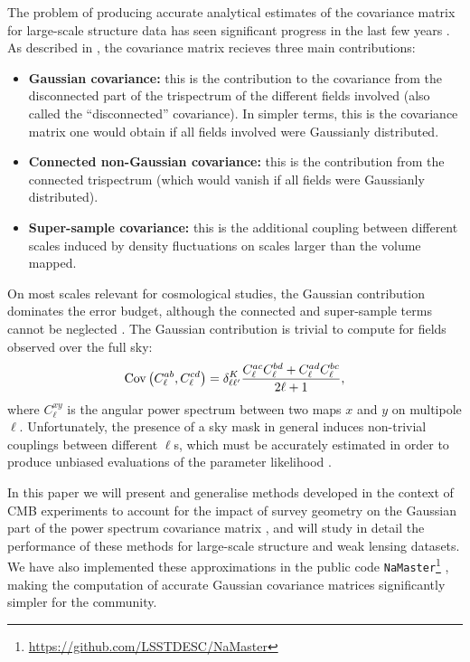 \documentclass[a4paper,11pt]{article}
\begin{document}
    The problem of producing accurate analytical estimates of the covariance matrix for large-scale structure data has seen significant progress in the last few years \cite{2001ApJ...554...56C,2009ApJ...701..945S,2009MNRAS.395.2065T,2013PhRvD..87l3504T,2014MNRAS.441.2456T,2016PhRvD..94f3533P}. As described in \cite{2018JCAP...10..053B}, the covariance matrix recieves three main contributions:
    \begin{itemize}
      \item {\bf Gaussian covariance:} this is the contribution to the covariance from the disconnected part of the trispectrum of the different fields involved (also called the ``disconnected'' covariance). In simpler terms, this is the covariance matrix one would obtain if all fields involved were Gaussianly distributed.
      \item {\bf Connected non-Gaussian covariance:} this is the contribution
        from the connected trispectrum (which would vanish if all fields were
        Gaussianly distributed).
      \item {\bf Super-sample covariance:} this is the additional coupling between different scales induced by density fluctuations on scales larger than the volume mapped.
    \end{itemize}
  
    On most scales relevant for cosmological studies, the Gaussian contribution dominates the error budget, although the connected and super-sample terms cannot be neglected \cite{2018JCAP...10..053B}. The Gaussian contribution is trivial to compute for fields observed over the full sky:
    \begin{equation}\label{eq:cov_naive}
      {\rm Cov}\left(C^{ab}_\ell,C^{cd}_\ell\right)=\delta^K_{\ell\ell'}\frac{C^{ac}_\ell C^{bd}_\ell+C^{ad}_\ell C^{bc}_\ell}{2\ell+1},
    \end{equation}
    where $C^{xy}_\ell$ is the angular power spectrum between two maps $x$ and $y$ on multipole $\ell$. Unfortunately, the presence of a sky mask in general induces non-trivial couplings between different $\ell$s, which must be accurately estimated in order to produce unbiased evaluations of the parameter likelihood \cite{2018MNRAS.479.4998T}.
  
    In this paper we will present and generalise methods developed in the context of CMB experiments to account for the impact of survey geometry on the Gaussian part of the power spectrum covariance matrix \cite{2004MNRAS.349..603E,2005MNRAS.360.1262B,2017A&A...602A..41C}, and will study in detail the performance of these methods for large-scale structure and weak lensing datasets. We have also implemented these approximations in the public code {\tt NaMaster}\footnote{\url{https://github.com/LSSTDESC/NaMaster}} \cite{2019MNRAS.484.4127A}, making the computation of accurate Gaussian covariance matrices significantly simpler for the community.
\end{document}
